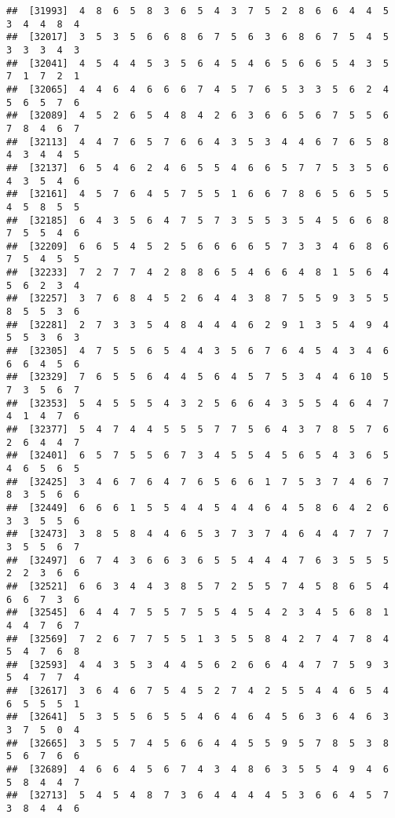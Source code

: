 \documentclass[
]{book}
\begin{document}
\begin{verbatim}
##  [31993]  4  8  6  5  8  3  6  5  4  3  7  5  2  8  6  6  4  4  5  3  4  4  8  4
##  [32017]  3  5  3  5  6  6  8  6  7  5  6  3  6  8  6  7  5  4  5  3  3  3  4  3
##  [32041]  4  5  4  4  5  3  5  6  4  5  4  6  5  6  6  5  4  3  5  7  1  7  2  1
##  [32065]  4  4  6  4  6  6  6  7  4  5  7  6  5  3  3  5  6  2  4  5  6  5  7  6
##  [32089]  4  5  2  6  5  4  8  4  2  6  3  6  6  5  6  7  5  5  6  7  8  4  6  7
##  [32113]  4  4  7  6  5  7  6  6  4  3  5  3  4  4  6  7  6  5  8  4  3  4  4  5
##  [32137]  6  5  4  6  2  4  6  5  5  4  6  6  5  7  7  5  3  5  6  4  3  5  4  6
##  [32161]  4  5  7  6  4  5  7  5  5  1  6  6  7  8  6  5  6  5  5  4  5  8  5  5
##  [32185]  6  4  3  5  6  4  7  5  7  3  5  5  3  5  4  5  6  6  8  7  5  5  4  6
##  [32209]  6  6  5  4  5  2  5  6  6  6  6  5  7  3  3  4  6  8  6  7  5  4  5  5
##  [32233]  7  2  7  7  4  2  8  8  6  5  4  6  6  4  8  1  5  6  4  5  6  2  3  4
##  [32257]  3  7  6  8  4  5  2  6  4  4  3  8  7  5  5  9  3  5  5  8  5  5  3  6
##  [32281]  2  7  3  3  5  4  8  4  4  4  6  2  9  1  3  5  4  9  4  5  5  3  6  3
##  [32305]  4  7  5  5  6  5  4  4  3  5  6  7  6  4  5  4  3  4  6  6  6  4  5  6
##  [32329]  7  6  5  5  6  4  4  5  6  4  5  7  5  3  4  4  6 10  5  7  3  5  6  7
##  [32353]  5  4  5  5  5  4  3  2  5  6  6  4  3  5  5  4  6  4  7  4  1  4  7  6
##  [32377]  5  4  7  4  4  5  5  5  7  7  5  6  4  3  7  8  5  7  6  2  6  4  4  7
##  [32401]  6  5  7  5  5  6  7  3  4  5  5  4  5  6  5  4  3  6  5  4  6  5  6  5
##  [32425]  3  4  6  7  6  4  7  6  5  6  6  1  7  5  3  7  4  6  7  8  3  5  6  6
##  [32449]  6  6  6  1  5  5  4  4  5  4  4  6  4  5  8  6  4  2  6  3  3  5  5  6
##  [32473]  3  8  5  8  4  4  6  5  3  7  3  7  4  6  4  4  7  7  7  3  5  5  6  7
##  [32497]  6  7  4  3  6  6  3  6  5  5  4  4  4  7  6  3  5  5  5  2  2  3  6  6
##  [32521]  6  6  3  4  4  3  8  5  7  2  5  5  7  4  5  8  6  5  4  6  6  7  3  6
##  [32545]  6  4  4  7  5  5  7  5  5  4  5  4  2  3  4  5  6  8  1  4  4  7  6  7
##  [32569]  7  2  6  7  7  5  5  1  3  5  5  8  4  2  7  4  7  8  4  5  4  7  6  8
##  [32593]  4  4  3  5  3  4  4  5  6  2  6  6  4  4  7  7  5  9  3  5  4  7  7  4
##  [32617]  3  6  4  6  7  5  4  5  2  7  4  2  5  5  4  4  6  5  4  6  5  5  5  1
##  [32641]  5  3  5  5  6  5  5  4  6  4  6  4  5  6  3  6  4  6  3  3  7  5  0  4
##  [32665]  3  5  5  7  4  5  6  6  4  4  5  5  9  5  7  8  5  3  8  5  6  7  6  6
##  [32689]  4  6  6  4  5  6  7  4  3  4  8  6  3  5  5  4  9  4  6  5  8  4  4  7
##  [32713]  5  4  5  4  8  7  3  6  4  4  4  4  5  3  6  6  4  5  7  3  8  4  4  6

\end{verbatim}
\end{document}

